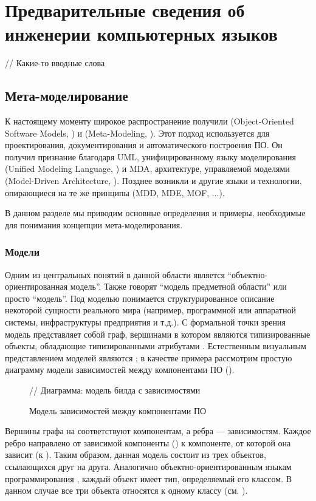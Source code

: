\part{Предварительные сведения об инженерии компьютерных языков}

// Какие-то вводные слова

\chapter{Мета-моделирование}

К настоящему моменту широкое распространение получили  (Object-Oriented Software Models, \cite{OOSM}) и  (Meta-Modeling, \cite{MM}). Этот подход используется для проектирования, документирования и автоматического построения ПО. Он получил признание благодаря UML, унифицированному языку моделирования (Unified Modeling Language, \cite{UML}) и MDA, архитектуре, управляемой моделями (Model-Driven Architecture, \cite{MDA}).
Позднее возникли и другие языки и технологии, опирающиеся на те же принципы (MDD, MDE, MOF, ...).

В данном разделе мы приводим основные определения и примеры, необходимые для понимания концепции мета-моделирования. 

\section{Модели}

Одним из центральных понятий в данной области является ``объектно-ориентированная модель''.  Также говорят ``модель предметной области'' или просто ``модель''. Под моделью понимается структурированное описание некоторой сущности реального мира (например, программной или аппаратной системы, инфраструктуры предприятия и т.д.). С формальной точки зрения модель представляет собой граф, вершинами в котором являются типизированные объекты, обладающие типизированными атрибутами \cite{KM3}. Естественным визуальным представлением моделей являются ; в качестве примера рассмотрим простую диаграмму модели зависимостей между компонентами ПО ().

\begin{figure}[htbp]
// Диаграмма: модель билда с зависимостями
\caption{Модель зависимостей между компонентами ПО}\label{DiagramExample}
\end{figure}

Вершины графа на  соответствуют компонентам, а ребра --- зависимостям. Каждое ребро направлено от зависимой компоненты () к компоненте, от которой она зависит (к ). Таким образом, данная модель состоит из трех объектов, ссылающихся друг на друга. Аналогично объектно-ориентированным языкам программирования \cite{Java}, каждый объект имеет тип, определяемый его классом. В данном случае все три объекта относятся к одному классу  (см. ). 

